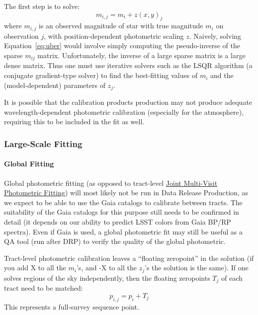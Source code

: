 The first step is to solve:
\begin{equation} \label{eq:uber}
m_{i,j} = m_i + z(x, y)_j
\end{equation}
where $m_{i,j}$ is an observed magnitude of star with true magnitude $m_i$ on observation $j$, with position-dependent photometric scaling $z$.   Naively, solving Equation~\ref{eq:uber} would involve simply computing the pseudo-inverse of the sparse $m_{ij}$ matrix. Unfortunately, the inverse of a large sparse matrix is a large dense matrix.  Thus one must use iterative solvers such as the LSQR algorithm (a conjugate gradient-type solver) to find the best-fitting values of $m_i$ and the (model-dependent) parameters of $z_j$.

It is possible that the calibration products production may not produce adequate wavelength-dependent photometric calibration (especially for the atmosphere), requiring this to be included in the fit as well.

\subsubsection{Large-Scale Fitting}

\paragraph{Global Fitting}
\label{sec:acGlobalPhotometricFit}

Global photometric fitting (as opposed to tract-level \hyperref[sec:acJointPhotometricFit]{Joint Multi-Visit Photometric Fitting}) will most likely not be run in Data Release Production, as we expect to be able to use the Gaia catalogs to calibrate between tracts.  The suitability of the Gaia catalogs for this purpose still needs to be confirmed in detail (it depends on our ability to predict LSST colors from Gaia BP/RP spectra).  Even if Gaia is used, a global photometric fit may still be useful as a QA tool (run after DRP) to verify the quality of the global photometric.

Tract-level photometric calibration leaves a ``floating zeropoint'' in the solution (if you add X to all the $m_i$'s, and -X to all the $z_j$'s the solution is the same).  If one solves regions of the sky independently, then the floating zeropoints $T_j$ of each tract need to be matched:
\begin{equation}
p_{i,j} = p_i + T_j
\end{equation}
This represents a full-survey sequence point.

